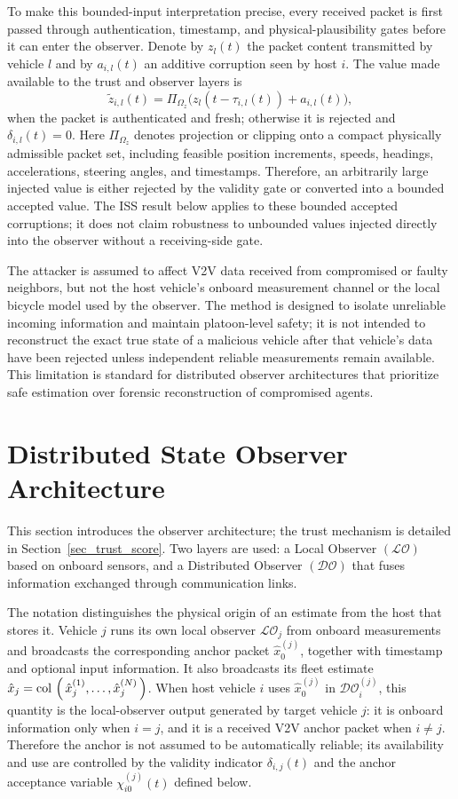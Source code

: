 \documentclass[journal,twoside]{IEEEtran}
\def\col#1{\mathop{{\rm col}\,\left(\,#1\,\right)}}
\def\LO{\mathcal{LO}} %
\def\DO{\mathcal{DO}} %
\begin{document}
To make this bounded-input interpretation precise, every received packet is first passed through authentication, timestamp, and physical-plausibility gates before it can enter the observer. Denote by $z_l(t)$ the packet content transmitted by vehicle $l$ and by $a_{i,l}(t)$ an additive corruption seen by host $i$. The value made available to the trust and observer layers is
\begin{equation}
    \tilde z_{i,l}(t)
    =
    \Pi_{\Omega_z}\big(z_l(t-\tau_{i,l}(t))+a_{i,l}(t)\big),
    \label{eq_received_packet_gate}
\end{equation}
when the packet is authenticated and fresh; otherwise it is rejected and $\delta_{i,l}(t)=0$. Here $\Pi_{\Omega_z}$ denotes projection or clipping onto a compact physically admissible packet set, including feasible position increments, speeds, headings, accelerations, steering angles, and timestamps. Therefore, an arbitrarily large injected value is either rejected by the validity gate or converted into a bounded accepted value. The ISS result below applies to these bounded accepted corruptions; it does not claim robustness to unbounded values injected directly into the observer without a receiving-side gate.

The attacker is assumed to affect V2V data received from compromised or faulty neighbors, but not the host vehicle's onboard measurement channel or the local bicycle model used by the observer. The method is designed to isolate unreliable incoming information and maintain platoon-level safety; it is not intended to reconstruct the exact true state of a malicious vehicle after that vehicle's data have been rejected unless independent reliable measurements remain available. This limitation is standard for distributed observer architectures that prioritize safe estimation over forensic reconstruction of compromised agents.

\section{Distributed State Observer Architecture}\label{sec_distributed_observer}
This section introduces the observer architecture; the trust mechanism is detailed in Section~\ref{sec_trust_score}. Two layers are used: a Local Observer $(\LO)$ based on onboard sensors, and a Distributed Observer $(\DO)$ that fuses information exchanged through communication links.

The notation distinguishes the physical origin of an estimate from the host that stores it. Vehicle $j$ runs its own local observer $\LO_j$ from onboard measurements and broadcasts the corresponding anchor packet $\hat{x}_0^{(j)}$, together with timestamp and optional input information. It also broadcasts its fleet estimate $\hat{x}_j=\col{\hat{x}_j^{(1)},\ldots,\hat{x}_j^{(N)}}$. When host vehicle $i$ uses $\hat{x}_0^{(j)}$ in $\DO_i^{(j)}$, this quantity is the local-observer output generated by target vehicle $j$: it is onboard information only when $i=j$, and it is a received V2V anchor packet when $i\neq j$. Therefore the anchor is not assumed to be automatically reliable; its availability and use are controlled by the validity indicator $\delta_{i,j}(t)$ and the anchor acceptance variable $\chi_{i0}^{(j)}(t)$ defined below.
\end{document}
